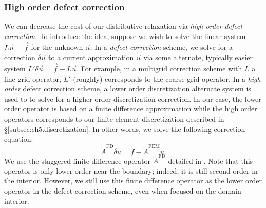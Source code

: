 \subsubsection{High order defect correction}

We can decrease the cost of our distributive relaxation via \emph{high order defect correction}. To introduce the idea, suppose we wish to solve the linear system $L \vec{u} = \vec{f}$ for the unknown $\vec{u}$. In a \emph{defect correction} scheme, we solve for a correction $\delta\vec{u}$ to a current approximation $\vec{u}$ via some alternate, typically easier system $L' \delta\vec{u} = \vec{f} - L \vec{u}$. For example, in a multigrid correction scheme with $L$ a fine grid operator, $L'$ (roughly) corresponds to the coarse grid operator. In a \emph{high order} defect correction scheme, a lower order discretization alternate system is used to to solve for a higher order discretization correction. In our case, the lower order operator is based on a finite difference approximation while the high order operators corresponds to our finite element discretization described in \S\ref{subsec:ch5.discretization}. In other words, we solve the following correction equation:
\begin{equation*}
\tilde{A}^{\text{FD}} \delta\tilde{u} = \tilde{f} - \tilde{A}^{\text{FEM}} \tilde{u}.
\end{equation*}
We use the staggered finite difference operator $\tilde{A}^{\text{FD}}$ detailed in \cite{Zhu.Yongning10}. Note that this operator is only lower order near the boundary; indeed, it is still second order in the interior. However, we still use this finite difference operator as the lower order operator in the defect correction scheme, even when focused on the domain interior.

